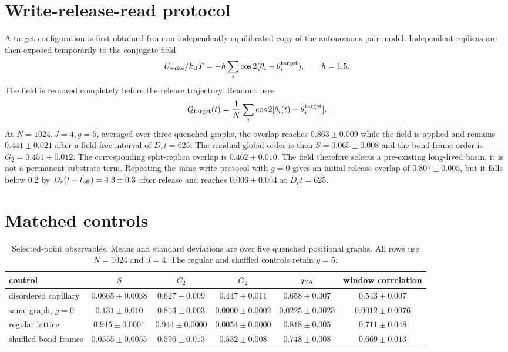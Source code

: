 \documentclass[aps,prl,onecolumn,superscriptaddress,nofootinbib]{revtex4-2}
\begin{document}
\section{Write-release-read protocol}

A target configuration is first obtained from an independently equilibrated
copy of the autonomous pair model.  Independent replicas are then exposed
temporarily to the conjugate field
\begin{equation}
 U_{\rm write}/k_{\rm B}T=-h\sum_i
 \cos2(\theta_i-\theta_i^{\rm target}),
 \qquad h=1.5.
 \label{eq:supp-write}
\end{equation}
The field is removed completely before the release trajectory.  Readout uses
\begin{equation}
 Q_{\rm target}(t)=\frac{1}{N}\sum_i
 \cos2[\theta_i(t)-\theta_i^{\rm target}].
 \label{eq:supp-target}
\end{equation}
At \(N=1024,J=4,g=5\), averaged over three quenched graphs, the overlap
reaches \(0.863\pm0.009\) while the field is applied and remains
\(0.441\pm0.021\) after a field-free interval of \(D_rt=625\).  The residual
global order is then \(S=0.065\pm0.008\) and the bond-frame order is
\(G_2=0.451\pm0.012\).  The corresponding split-replica overlap is
\(0.462\pm0.010\).  The field therefore selects a pre-existing
long-lived basin; it is not a permanent substrate term.  Repeating the same
write protocol with \(g=0\) gives an initial release overlap of
\(0.807\pm0.005\), but it falls below 0.2 by
\(D_r(t-t_{\rm off})=4.3\pm0.3\) after release and reaches
\(0.006\pm0.004\) at \(D_rt=625\).

\section{Matched controls}

\begin{table}[ht]
\centering
\caption{Selected-point observables.  Means and standard deviations are over
five quenched positional graphs.  All rows use \(N=1024\) and \(J=4\).
The regular and shuffled controls retain \(g=5\).}
\label{tab:supp-controls}
\begin{ruledtabular}
\begin{tabular}{lccccc}
control & \(S\) & \(C_2\) & \(G_2\) & \(q_{\rm EA}\) &
window correlation\\
\hline
disordered capillary &
\(0.0665\pm0.0038\)&\(0.627\pm0.009\)&\(0.447\pm0.011\)&
\(0.658\pm0.007\)&\(0.543\pm0.007\)\\
same graph, \(g=0\) &
\(0.131\pm0.010\)&\(0.813\pm0.003\)&\(0.0000\pm0.0002\)&
\(0.0225\pm0.0023\)&\(0.0012\pm0.0076\)\\
regular lattice &
\(0.945\pm0.0001\)&\(0.944\pm0.0000\)&\(0.0054\pm0.0000\)&
\(0.818\pm0.005\)&\(0.711\pm0.048\)\\
shuffled bond frames &
\(0.0555\pm0.0055\)&\(0.596\pm0.013\)&\(0.532\pm0.008\)&
\(0.748\pm0.008\)&\(0.669\pm0.013\)\\
\end{tabular}
\end{ruledtabular}
\end{table}
\end{document}
